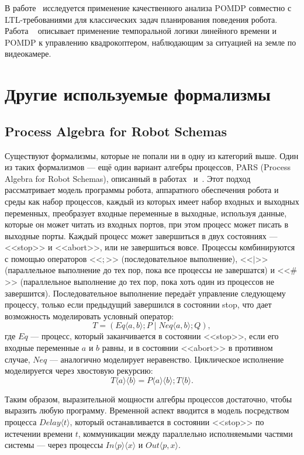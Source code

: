 \documentclass[a4, 14pt]{article}
\begin{document}
В работе~\cite{chatterjee2014qualitative} исследуется применение качественного 
анализа POMDP совместно с LTL-требованиями для классических задач планирования 
поведения робота. Работа ~\cite{svorevnova2015temporal} описывает применение 
темпоральной логики линейного времени и POMDP к управлению квадрокоптером, 
наблюдающим за ситуацией на земле по видеокамере.

\section{Другие используемые формализмы}

\subsection{Process Algebra for Robot Schemas}

Существуют формализмы, которые не попали ни в одну из категорий выше. 
Один из таких формализмов --- ещё один вариант алгебры процессов, 
PARS (Process Algebra for Robot Schemas), описанный в работах~\cite{lyons2015performance} 
и~\cite{lyons2013software}. Этот подход рассматривает модель программы робота, 
аппаратного обеспечения робота и среды как набор процессов, каждый из которых 
имеет набор входных и выходных переменных, преобразует входные переменные в 
выходные, используя данные, которые он может читать из входных портов, при этом 
процесс может писать в выходные порты. Каждый процесс может завершиться 
в двух состояниях --- <<stop>> и <<abort>>, или не завершиться вовсе. Процессы 
комбинируются с помощью операторов <<$;$>> (последовательное выполнение), <<$|$>> 
(параллельное выполнение до тех пор, пока все процессы не завершатся) и <<$\#$>> 
(параллельное выполнение до тех пор, пока хоть один из процессов не завершится). 
Последовательное выполнение передаёт управление следующему процессу, только если 
предыдущий завершился в состоянии stop, что дает возможность моделировать 
условный оператор:
$$T = (Eq\langle a,b\rangle; P\;|\;Neq\langle a,b\rangle;Q),$$
где $Eq$ --- процесс, который заканчивается в состоянии <<stop>>, если 
его входные переменные $a$ и $b$ равны, и в состоянии <<abort>> в противном 
случае, $Neq$ --- аналогично моделирует неравенство. Циклическое 
исполнение моделируется через хвостовую рекурсию: 
$$T\langle a\rangle\langle b\rangle = P\langle a\rangle\langle b\rangle; T\langle b\rangle.$$

Таким образом, выразительной мощности алгебры процессов достаточно, чтобы 
выразить любую программу. Временной аспект вводится в модель посредством 
процесса $Delay\langle t\rangle$, который останавливается в состоянии <<stop>> по 
истечении времени $t$, коммуникации между параллельно исполняемыми частями 
системы --- через процессы $In\langle p\rangle\langle x\rangle$ и $Out\langle p, x\rangle$.
\end{document}
